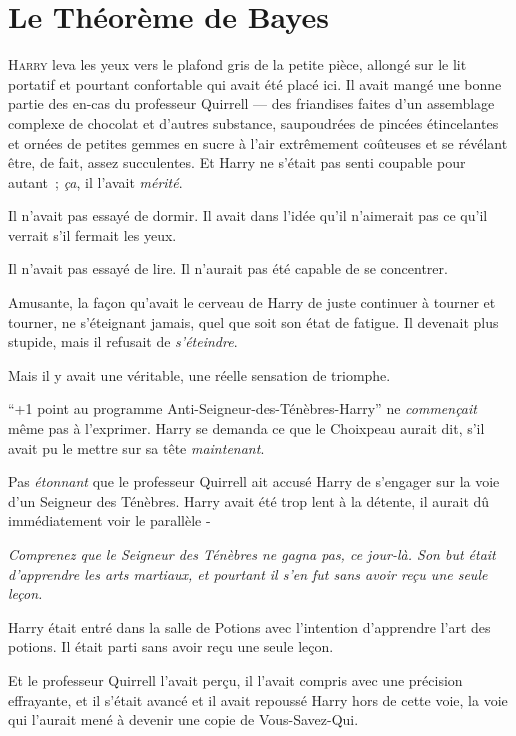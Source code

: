 \chapter{Le Théorème de Bayes}

\lettrine{H}{arry} leva les yeux vers le plafond gris de la petite pièce, allongé sur le lit portatif et pourtant confortable qui avait été placé ici. Il avait mangé une bonne partie des en-cas du professeur Quirrell — des friandises faites d'un assemblage complexe de chocolat et d'autres substance, saupoudrées de pincées étincelantes et ornées de petites gemmes en sucre à l'air extrêmement coûteuses et se révélant être, de fait, assez succulentes. Et Harry ne s'était pas senti coupable pour autant~; \emph{ça}, il l'avait \emph{mérité}.

Il n'avait pas essayé de dormir. Il avait dans l'idée qu'il n'aimerait pas ce qu'il verrait s'il fermait les yeux.

Il n'avait pas essayé de lire. Il n'aurait pas été capable de se concentrer.

Amusante, la façon qu'avait le cerveau de Harry de juste continuer à tourner et tourner, ne s'éteignant jamais, quel que soit son état de fatigue. Il devenait plus stupide, mais il refusait de \emph{s'éteindre}.

Mais il y avait une véritable, une réelle sensation de triomphe.

“+1 point au programme Anti-Seigneur-des-Ténèbres-Harry” ne \emph{commençait} même pas à l'exprimer. Harry se demanda ce que le Choixpeau aurait dit, s'il avait pu le mettre sur sa tête \emph{maintenant}.

Pas \emph{étonnant} que le professeur Quirrell ait accusé Harry de s'engager sur la voie d'un Seigneur des Ténèbres. Harry avait été trop lent à la détente, il aurait dû immédiatement voir le parallèle -

\emph{Comprenez que le Seigneur des Ténèbres ne gagna pas, ce jour-là. Son but était d'apprendre les arts martiaux, et pourtant il s'en fut sans avoir reçu une seule leçon.}

Harry était entré dans la salle de Potions avec l'intention d'apprendre l'art des potions. Il était parti sans avoir reçu une seule leçon.

Et le professeur Quirrell l'avait perçu, il l'avait compris avec une précision effrayante, et il s'était avancé et il avait repoussé Harry hors de cette voie, la voie qui l'aurait mené à devenir une copie de Vous-Savez-Qui.


